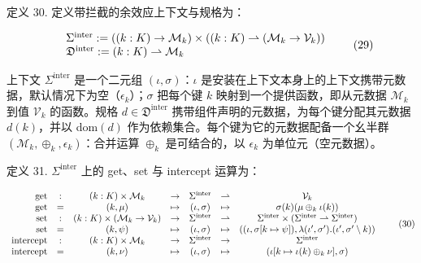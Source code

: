 \documentclass[
  10
]{article}
\begin{document}
定义 30. 定义带拦截的余效应上下文与规格为：

\[
\begin{array} { r l } & { \Sigma ^ { \mathrm { i n t e r } } : = ( ( k : K ) \to \mathcal { M } _ { k } ) \times ( ( k : K ) \rightharpoonup ( \mathcal { M } _ { k } \to \mathcal { V } _ { k } ) ) } \\ & { \mathfrak { D } ^ { \mathrm { i n t e r } } : = ( k : K ) \rightharpoonup \mathcal { M } _ { k } } \end{array}\tag{29}
\]

上下文 \(\Sigma ^ { \mathrm { i n t e r } }\) 是一个二元组 \(( \iota , \sigma )\)：\(\iota\) 是安装在上下文本身上的上下文携带元数据，默认情况下为空（\(\epsilon _ { k }\)）；\(\sigma\) 把每个键 \(k\) 映射到一个提供函数，即从元数据 \(\mathcal { M } _ { k }\) 到值 \(\mathcal { V } _ { k }\) 的函数。规格 \(d \in \mathfrak { D } ^ { \mathrm { i n t e r } }\) 携带组件声明的元数据，为每个键分配其元数据 \(d ( k )\)，并以 dom\(( d )\) 作为依赖集合。每个键为它的元数据配备一个幺半群 \(( \mathcal { M } _ { k } , \oplus _ { k } , \epsilon _ { k } )\)：合并运算 \(\oplus _ { k }\) 是可结合的，以 \(\epsilon _ { k }\) 为单位元（空元数据）。

定义 31. \(\Sigma ^ { \mathrm { i n t e r } }\) 上的 get、set 与 intercept 运算为：

\[
\begin{array} { r c c c c c c } { \mathrm { g e t } } & { : } & { ( k : K ) \times \mathcal { M } _ { k } } & { \to } & { \Sigma ^ { \mathrm { i n t e r } } } & { \rightharpoonup } & { \mathcal { V } _ { k } } \\ { \mathrm { g e t } } & { = } & { ( k , \mu ) } & { \mapsto } & { ( \iota , \sigma ) } & { \mapsto } & { \sigma ( k ) ( \mu \oplus _ { k } \iota ( k ) ) } \\ { \mathrm { s e t } } & { : } & { ( k : K ) \times ( \mathcal { M } _ { k } \to \mathcal { V } _ { k } ) } & { \to } & { \Sigma ^ { \mathrm { i n t e r } } } & { \rightharpoonup } & { \Sigma ^ { \mathrm { i n t e r } } \times ( \Sigma ^ { \mathrm { i n t e r } } \rightharpoonup \Sigma ^ { \mathrm { i n t e r } } ) } \\ { \mathrm { s e t } } & { = } & { ( k , \psi ) } & { \mapsto } & { ( \iota , \sigma ) } & { \mapsto } & { ( ( \iota , \sigma [ k \mapsto \psi ] ) , \lambda ( \iota ^ { \prime } , \sigma ^ { \prime } ) . ( \iota ^ { \prime } , \sigma ^ { \prime } \setminus k ) ) } \\ { \mathrm { i n t e r c e p t } } & { : } & { ( k : K ) \times \mathcal { M } _ { k } } & { \to } & { \Sigma ^ { \mathrm { i n t e r } } } & { \to } & { \Sigma ^ { \mathrm { i n t e r } } } \\ { \mathrm { i n t e r c e p t } } & { = } & { ( k , \nu ) } & { \mapsto } & { ( \iota , \sigma ) } & { \mapsto } & { ( \iota [ k \mapsto \iota ( k ) \oplus _ { k } \nu ] , \sigma ) } \end{array}\tag{30}
\]
\end{document}
